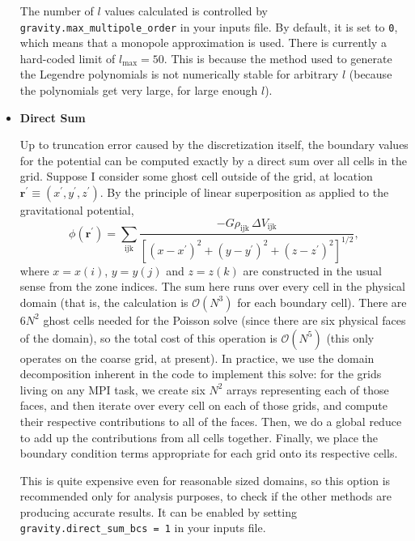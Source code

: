 \begin{itemize}
The number of $l$ values calculated is controlled by
\texttt{gravity.max\_multipole\_order} in your inputs file. By
default, it is set to \texttt{0}, which means that a monopole
approximation is used. There is currently a hard-coded limit of
$l_{\text{max}} = 50$. This is because the method used to generate the
Legendre polynomials is not numerically stable for arbitrary $l$
(because the polynomials get very large, for large enough $l$).

\item \textbf{Direct Sum}

Up to truncation error caused by the discretization itself, the
boundary values for the potential can be computed exactly by a direct
sum over all cells in the grid. Suppose I consider some ghost cell
outside of the grid, at location $\mathbf{r}^\prime \equiv (x^\prime,
y^\prime, z^\prime)$. By the principle of linear superposition as
applied to the gravitational potential,
\begin{equation}
  \phi(\mathbf{r}^\prime) = \sum_{\text{ijk}} \frac{-G \rho_{\text{ijk}}\, \Delta V_{\text{ijk}}}{\left[(x - x^\prime)^2 + (y - y^\prime)^2 + (z - z^\prime)^2\right]^{1/2}},
\end{equation}
where $x = x(i)$, $y = y(j)$ and $z = z(k)$ are constructed in the
usual sense from the zone indices. The sum here runs over every cell
in the physical domain (that is, the calculation is $\mathcal{O}(N^3)$
for each boundary cell). There are $6N^2$ ghost cells needed for the
Poisson solve (since there are six physical faces of the domain), so
the total cost of this operation is $\mathcal{O}(N^5)$ (this only
operates on the coarse grid, at present). In practice, we use the
domain decomposition inherent in the code to implement this solve: for
the grids living on any MPI task, we create six $N^2$ arrays
representing each of those faces, and then iterate over every cell on
each of those grids, and compute their respective contributions to all
of the faces. Then, we do a global reduce to add up the contributions
from all cells together. Finally, we place the boundary condition
terms appropriate for each grid onto its respective cells.

This is quite expensive even for reasonable sized domains, so this
option is recommended only for analysis purposes, to check if the
other methods are producing accurate results. It can be enabled by
setting \texttt{gravity.direct\_sum\_bcs = 1} in your inputs file.

\end{itemize}



